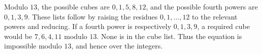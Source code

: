 Modulo $13$, the possible cubes are $0,1,5,8,12$, and the possible fourth powers are $0,1,3,9$. These lists follow by raising the residues $0,1,\ldots,12$ to the relevant powers and reducing. If a fourth power is respectively $0,1,3,9$, a required cube would be $7,6,4,11$ modulo $13$. None is in the cube list. Thus the equation is impossible modulo $13$, and hence over the integers.
